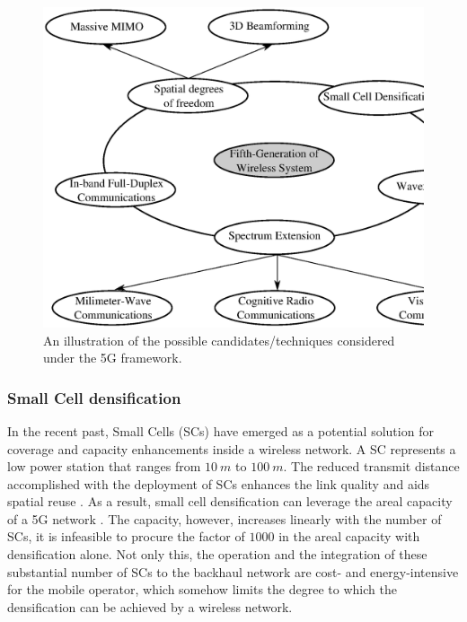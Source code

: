 \begin{figure}
\centering
\includegraphics[width = 0.98 \columnwidth]{figures/5G}
\caption{An illustration of the possible candidates/techniques considered under the 5G framework.}
\label{fig:5G}
\end{figure}


\subsubsection*{Small Cell densification}

In the recent past, Small Cells (SCs) have emerged as a potential solution for coverage and capacity enhancements inside a wireless network. A SC represents a low power station that ranges from $\SI{10}{m}$ to $\SI{100}{m}$. The reduced transmit distance accomplished with the deployment of SCs enhances the link quality and aids spatial reuse \cite{Chander08}.
As a result, small cell densification can leverage the areal capacity of a 5G network \cite{Andrews14}. The capacity, however, increases linearly with the number of SCs, it is infeasible to procure the factor of $1000$ in the areal capacity with densification alone. Not only this, the operation and the integration of these substantial number of SCs to the backhaul network are cost- and energy-intensive for the mobile operator, which somehow limits the degree to which the densification can be achieved by a wireless network.





